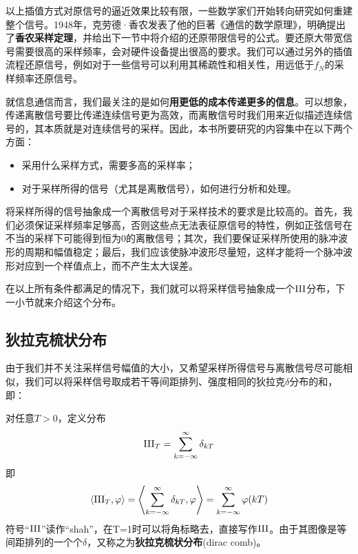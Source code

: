以上插值方式对原信号的逼近效果比较有限，一些数学家们开始转向研究如何重建整个信号。1948年，克劳德·香农发表了他的巨著《通信的数学原理》，明确提出了\textbf{香农采样定理}，并给出下一节中将介绍的还原带限信号的公式。要还原大带宽信号需要很高的采样频率，会对硬件设备提出很高的要求。我们可以通过另外的插值流程还原信号，例如对于一些信号可以利用其稀疏性和相关性，用远低于$f_N$的采样频率还原信号。

就信息通信而言，我们最关注的是如何\textbf{用更低的成本传递更多的信息}。可以想象，传递离散信号要比传递连续信号更为高效，而离散信号时我们用来近似描述连续信号的，其本质就是对连续信号的采样。因此，本书所要研究的内容集中在以下两个方面：\begin{itemize}
    \item 采用什么采样方式，需要多高的采样率；
    \item 对于采样所得的信号（尤其是离散信号），如何进行分析和处理。
\end{itemize}

将采样所得的信号抽象成一个离散信号对于采样技术的要求是比较高的。首先，我们必须保证采样频率足够高，否则这些点无法表征原信号的特性，例如正弦信号在不当的采样下可能得到恒为0的离散信号；其次，我们要保证采样所使用的脉冲波形的周期和幅值稳定；最后，我们应该使脉冲波形尽量短，这样才能将一个脉冲波形对应到一个样值点上，而不产生太大误差。

在以上所有条件都满足的情况下，我们就可以将采样信号抽象成一个$\operatorname{III}$分布，下一小节就来介绍这个分布。

\subsection{狄拉克梳状分布}\label{sub:dirac_comb}
由于我们并不关注采样信号幅值的大小，又希望采样所得信号与离散信号尽可能相似，我们可以将采样信号取成若干等间距排列、强度相同的狄拉克$\delta$分布的和，即：
\begin{definition}[狄拉克梳状分布]
    对任意$T>0$，定义分布
    \begin{equation*}
        \operatorname{III}_T=\sum_{k=-\infty}^{\infty}\delta_{kT}
    \end{equation*}
    即\[\langle \operatorname{III}_T,\varphi\rangle=\left\langle \sum_{k=-\infty}^{\infty}\delta_{kT},\varphi\right\rangle=\sum_{k=-\infty}^{\infty}\varphi(kT)\]
    符号“$\operatorname{III}$”读作“shah”，在T=1时可以将角标略去，直接写作$\operatorname{III}$\cite{brad_osgood_ee261}。由于其图像是等间距排列的一个个$\delta$，又称之为\textbf{狄拉克梳状分布}(dirac comb)。
\end{definition}

